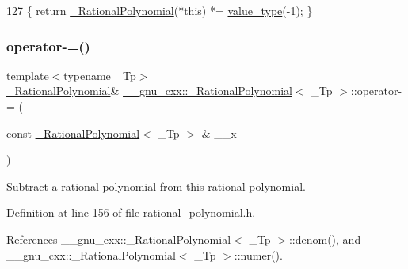 \begin{DoxyCode}
127       \{ \textcolor{keywordflow}{return} \hyperlink{class____gnu__cxx_1_1__RationalPolynomial_a35b2504272a73aa54b48310004c46fd1}{\_RationalPolynomial}(*\textcolor{keyword}{this}) *= \hyperlink{class____gnu__cxx_1_1__RationalPolynomial_adeec7f1bec03111031599f337848ee8b}{value\_type}(-1); \}
\end{DoxyCode}
\mbox{\label{class____gnu__cxx_1_1__RationalPolynomial_ad233308f7f97d2658486b5eae84f90a5}} 
\subsubsection{\texorpdfstring{operator-\/=()}{operator-=()}}
{\footnotesize\ttfamily template$<$typename \+\_\+\+Tp$>$ \\
\hyperlink{class____gnu__cxx_1_1__RationalPolynomial}{\+\_\+\+Rational\+Polynomial}\& \hyperlink{class____gnu__cxx_1_1__RationalPolynomial}{\+\_\+\+\_\+gnu\+\_\+cxx\+::\+\_\+\+Rational\+Polynomial}$<$ \+\_\+\+Tp $>$\+::operator-\/= (\begin{DoxyParamCaption}\item[{const \hyperlink{class____gnu__cxx_1_1__RationalPolynomial}{\+\_\+\+Rational\+Polynomial}$<$ \+\_\+\+Tp $>$ \&}]{\+\_\+\+\_\+x }\end{DoxyParamCaption})\hspace{0.3cm}{\ttfamily [inline]}}

Subtract a rational polynomial from this rational polynomial. 

Definition at line 156 of file rational\+\_\+polynomial.\+h.



References \+\_\+\+\_\+gnu\+\_\+cxx\+::\+\_\+\+Rational\+Polynomial$<$ \+\_\+\+Tp $>$\+::denom(), and \+\_\+\+\_\+gnu\+\_\+cxx\+::\+\_\+\+Rational\+Polynomial$<$ \+\_\+\+Tp $>$\+::numer().


